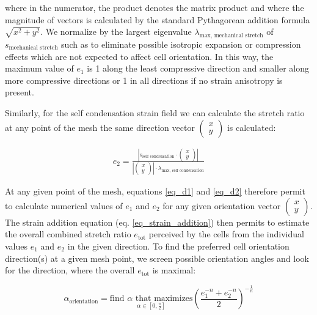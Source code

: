 \documentclass[11pt]{amsart}
\begin{document}
where in the numerator, the product denotes the matrix product and where the magnitude of vectors is calculated by the standard Pythagorean addition formula $\sqrt{x^2+y^2}$. We normalize by the largest eigenvalue $\lambda_\text{max, mechanical stretch}$ of $s_\text{mechanical stretch}$ such as to eliminate possible isotropic expansion or compression effects which are not expected to affect cell orientation. In this way, the maximum value of $e_1$ is 1 along the least compressive direction and smaller along more compressive directions or 1 in all directions if no strain anisotropy is present.

Similarly, for the self condensation strain field we can calculate the stretch ratio at any point of the mesh the same direction vector $\left( \begin{matrix}x \\ y \end{matrix} \right)$ is calculated: 

\begin{eqnarray}
e_2=\frac{\left| s_\text{self condensation} \cdot \left( \begin{matrix}x \\ y \end{matrix} \right)\right|}{\left| \left( \begin{matrix}x \\ y \end{matrix} \right)\right| \cdot \lambda_\text{max, self condensation} }  \label{eq_d2}
\end{eqnarray}

At any given point of the mesh, equations \ref{eq_d1} and \ref{eq_d2} therefore permit to calculate numerical values of $e_1$ and $e_2$ for any given orientation vector $\left( \begin{matrix}x \\ y \end{matrix} \right)$. The strain addition equation (eq. \ref{eq_strain_addition}) then permits to estimate the overall combined stretch ratio $e_\text{tot}$ perceived by the cells from the individual values $e_1$ and $e_2$ in the given direction. To find the preferred cell orientation direction(s) at a given mesh point, we screen possible orientation angles and look for the direction, where the overall $e_\text{tot}$ is maximal:

\begin{equation}
\alpha_\text{orientation} = \underset{ \alpha \in [0,\frac{\pi}{2}]}{\text{find $\alpha$ that maximizes}} \left( \frac{ e_1^{-n}+e_2^{-n}}{2} \right)^{-\frac{1}{n}} \label{eq_maximization_procedure}
\end{equation}
\end{document}
